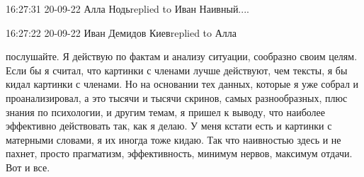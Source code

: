  

 
 
 
 





16:27:31 20-09-22
Алла Нодьreplied to Иван
Наивный....

16:27:22 20-09-22
Иван Демидов Киевreplied to Алла

послушайте. Я действую по фактам и анализу ситуации, сообразно своим целям.
Если бы я считал, что картинки с членами лучше действуют, чем тексты, я бы
кидал картинки с членами. Но на основании тех данных, которые я уже собрал и
проанализировал, а это тысячи и тысячи скринов, самых разнообразных, плюс
знания по психологии, и другим темам, я пришел к выводу, что наиболее
эффективно действовать так, как я делаю. У меня кстати есть и картинки с
матерными словами, я их иногда тоже кидаю. Так что наивностью здесь и не
пахнет, просто прагматизм, эффективность, минимум нервов, максимум отдачи. Вот
и все.


